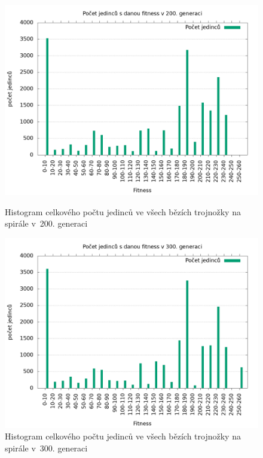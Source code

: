 \begin{figure}[h]
    \begin{minipage}[c]{0.48\linewidth}
        \includegraphics[width=\linewidth]{obrazky/trojnozka_spirala_fitnessHistogram200.png}
        \caption{Histogram celkového počtu jedinců ve všech bězích trojnožky na spirále v~200. generaci}
        \label{fig:trojnozka_spirala_histogram_200}
    \end{minipage}
    \hfill
    \begin{minipage}[c]{0.48\linewidth}
        \includegraphics[width=\linewidth]{obrazky/trojnozka_spirala_fitnessHistogram300.png}
        \caption{Histogram celkového počtu jedinců ve všech bězích trojnožky na spirále v~300. generaci}
        \label{fig:trojnozka_spirala_histogram_300}
    \end{minipage}
\end{figure}


